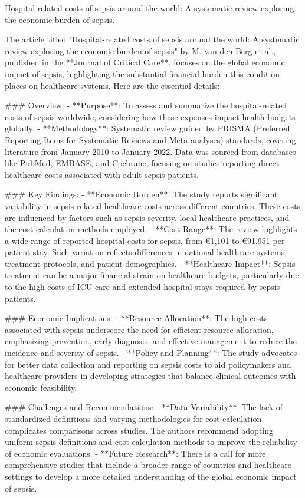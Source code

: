 \citep{van2022hospital}
Hospital-related costs of sepsis around the world: A systematic review exploring the economic burden of sepsis.

The article titled "Hospital-related costs of sepsis around the world: A systematic review exploring the economic burden of sepsis" by M. van den Berg et al., published in the **Journal of Critical Care**, focuses on the global economic impact of sepsis, highlighting the substantial financial burden this condition places on healthcare systems. Here are the essential details:

### Overview:
- **Purpose**: To assess and summarize the hospital-related costs of sepsis worldwide, considering how these expenses impact health budgets globally.
- **Methodology**: Systematic review guided by PRISMA (Preferred Reporting Items for Systematic Reviews and Meta-analyses) standards, covering literature from January 2010 to January 2022. Data was sourced from databases like PubMed, EMBASE, and Cochrane, focusing on studies reporting direct healthcare costs associated with adult sepsis patients.

### Key Findings:
- **Economic Burden**: The study reports significant variability in sepsis-related healthcare costs across different countries. These costs are influenced by factors such as sepsis severity, local healthcare practices, and the cost calculation methods employed.
- **Cost Range**: The review highlights a wide range of reported hospital costs for sepsis, from €1,101 to €91,951 per patient stay. Such variation reflects differences in national healthcare systems, treatment protocols, and patient demographics.
- **Healthcare Impact**: Sepsis treatment can be a major financial strain on healthcare budgets, particularly due to the high costs of ICU care and extended hospital stays required by sepsis patients.

### Economic Implications:
- **Resource Allocation**: The high costs associated with sepsis underscore the need for efficient resource allocation, emphasizing prevention, early diagnosis, and effective management to reduce the incidence and severity of sepsis.
- **Policy and Planning**: The study advocates for better data collection and reporting on sepsis costs to aid policymakers and healthcare providers in developing strategies that balance clinical outcomes with economic feasibility.

### Challenges and Recommendations:
- **Data Variability**: The lack of standardized definitions and varying methodologies for cost calculation complicates comparisons across studies. The authors recommend adopting uniform sepsis definitions and cost-calculation methods to improve the reliability of economic evaluations.
- **Future Research**: There is a call for more comprehensive studies that include a broader range of countries and healthcare settings to develop a more detailed understanding of the global economic impact of sepsis.


